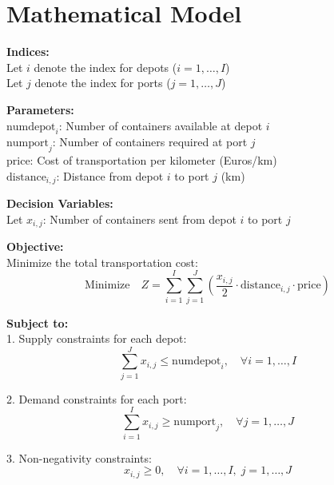\documentclass{article}
\begin{document}
\section*{Mathematical Model}

\textbf{Indices:} \\
Let \( i \) denote the index for depots (\( i = 1, \ldots, I \)) \\
Let \( j \) denote the index for ports (\( j = 1, \ldots, J \))

\textbf{Parameters:} \\
\( \text{numdepot}_i \): Number of containers available at depot \( i \) \\
\( \text{numport}_j \): Number of containers required at port \( j \) \\
\( \text{price} \): Cost of transportation per kilometer (Euros/km) \\
\( \text{distance}_{i,j} \): Distance from depot \( i \) to port \( j \) (km)

\textbf{Decision Variables:} \\
Let \( x_{i,j} \): Number of containers sent from depot \( i \) to port \( j \)

\textbf{Objective:} \\
Minimize the total transportation cost:
\[
\text{Minimize} \quad Z = \sum_{i=1}^{I} \sum_{j=1}^{J} \left( \frac{x_{i,j}}{2} \cdot \text{distance}_{i,j} \cdot \text{price} \right)
\]

\textbf{Subject to:} \\
1. Supply constraints for each depot:
\[
\sum_{j=1}^{J} x_{i,j} \leq \text{numdepot}_i, \quad \forall i = 1, \ldots, I
\]

2. Demand constraints for each port:
\[
\sum_{i=1}^{I} x_{i,j} \geq \text{numport}_j, \quad \forall j = 1, \ldots, J
\]

3. Non-negativity constraints:
\[
x_{i,j} \geq 0, \quad \forall i = 1, \ldots, I, \; j = 1, \ldots, J
\]
\end{document}
